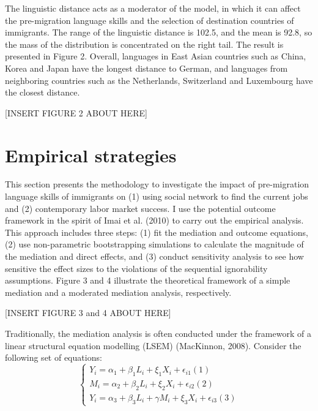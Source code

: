 \documentclass[12pt,a4paper]{article}
\begin{document}
The linguistic distance acts as a moderator of the model, in which it can affect the pre-migration language skills and the selection of destination countries of immigrants. The range of the linguistic distance is 102.5, and the mean is 92.8, so the mass of the distribution is concentrated on the right tail. The result is presented in Figure 2. Overall, languages in East Asian countries such as China, Korea and Japan have the longest distance to German, and languages from neighboring countries such as the Netherlands, Switzerland and Luxembourg have the closest distance.

\begin{center}
[INSERT FIGURE 2 ABOUT HERE]
\end{center}


\section{Empirical strategies}

This section presents the methodology to investigate the impact of pre-migration language skills of immigrants on (1) using social network to find the current jobs and (2) contemporary labor market success. I use the potential outcome framework in the spirit of Imai et al. (2010) to carry out the empirical analysis. This approach includes three steps: (1) fit the mediation and outcome equations, (2) use non-parametric bootstrapping simulations to calculate the magnitude of the mediation and direct effects, and (3) conduct sensitivity analysis to see how sensitive the effect sizes to the violations of the sequential ignorability assumptions. Figure 3 and 4 illustrate the theoretical framework of a simple mediation and a moderated mediation analysis, respectively.

\begin{center}
[INSERT FIGURE 3 and 4 ABOUT HERE]
\end{center}


Traditionally, the mediation analysis is often conducted under the framework of a linear structural equation modelling (LSEM) (MacKinnon, 2008). Consider the following set of equations:
$$
\begin{cases} Y_{i} = \alpha_{1} + \beta_{1}L_{i} + \xi_{1}X_{i} + \epsilon_{i1} (1) \\ M_{i} = \alpha_{2} + \beta_{2}L_{i} + \xi_{2}X_{i} + \epsilon_{i2} (2) \\ Y_{i} = \alpha_{3} + \beta_{3}L_{i} + \gamma M_{i} + \xi_{3}X_{i} + \epsilon_{i3} (3)
\end{cases}
$$
\end{document}
